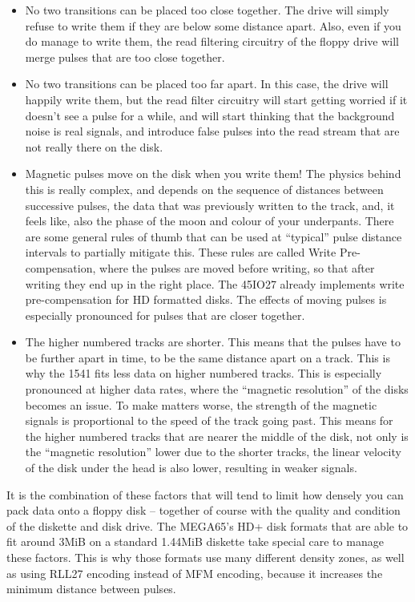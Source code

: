 \begin{itemize}
\item No two transitions can be placed too close together. The drive will simply refuse to write
  them if they are below some distance apart. Also, even if you do manage to write them, the
  read filtering circuitry of the floppy drive will merge pulses that are too close together.
\item No two transitions can be placed too far apart. In this case, the drive will happily
  write them, but the read filter circuitry will start getting worried if it doesn't see a pulse
  for a while, and will start thinking that the background noise is real signals, and introduce
  false pulses into the read stream that are not really there on the disk.
\item Magnetic pulses move on the disk when you write them! The physics behind this is really
  complex, and depends on the sequence of distances between successive pulses, the data that
  was previously written to the track, and, it feels like, also the phase of the moon and colour
  of your underpants.  There are some general rules of thumb that can be used at ``typical'' pulse
  distance intervals to partially mitigate this. These rules are called Write Pre-compensation, where
  the pulses are moved before writing, so that after writing they end up in the right place.
  The 45IO27 already implements write pre-compensation for HD formatted disks.  The effects of
  moving pulses is especially pronounced for pulses that are closer together.
\item The higher numbered tracks are shorter. This means that the pulses have to be further apart
  in time, to be the same distance apart on a track. This is why the 1541 fits less data on higher
  numbered tracks.  This is especially pronounced at higher data rates, where the ``magnetic resolution''
  of the disks becomes an issue.  To make matters worse, the strength of the magnetic signals
  is proportional to the speed of the track going past. This means for the higher numbered tracks
  that are nearer the middle of the disk, not only is the ``magnetic resolution'' lower due to the
  shorter tracks, the linear velocity of the disk under the head is also lower, resulting in weaker
  signals.
\end{itemize}

It is the combination of these factors that will tend to limit how densely you can pack data onto a
floppy disk -- together of course with the quality and condition of the diskette and disk drive.
The MEGA65's HD+ disk formats that are able to fit around 3MiB on a standard 1.44MiB diskette take
special care to manage these factors. This is why those formats use many different density zones,
as well as using RLL27 encoding instead of MFM encoding, because it increases the minimum distance
between pulses.


